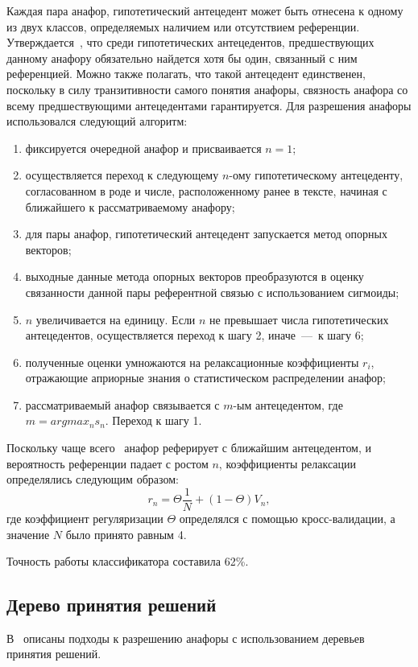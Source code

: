 Каждая пара анафор, гипотетический антецедент может быть отнесена к одному из двух классов, определяемых наличием или отсутствием референции. Утверждается~\cite{tolpegin2006algorithm}, что среди гипотетических антецедентов, предшествующих данному анафору обязательно найдется хотя бы один, связанный с ним референцией. Можно также полагать, что такой антецедент единственен, поскольку в силу транзитивности самого понятия анафоры, связность анафора со всему предшествующими антецедентами гарантируется. Для разрешения анафоры использовался следующий алгоритм:
\begin{enumerate}
	\item фиксируется очередной анафор и присваивается $n=1$;
	\item осуществляется переход к следующему $n$-ому гипотетическому антецеденту, согласованном в роде и числе, расположенному ранее в тексте, начиная с ближайшего к рассматриваемому анафору;
	\item для пары анафор, гипотетический антецедент запускается метод опорных векторов;
	\item выходные данные метода опорных векторов преобразуются в оценку связанности данной пары референтной связью с использованием сигмоиды;
	\item $n$ увеличивается на единицу. Если $n$ не превышает числа гипотетических антецедентов, осуществляется переход к шагу 2, иначе~---~к шагу 6;
	\item полученные оценки умножаются на релаксационные коэффициенты $r_i$, отражающие априорные знания о статистическом распределении анафор;
	\item рассматриваемый анафор связывается с $m$-ым антецедентом, где $m = argmax_n s_n$. Переход к шагу 1.  
\end{enumerate}

Поскольку чаще всего~\cite{tolpegin2006algorithm} анафор реферирует с ближайшим антецедентом, и вероятность референции падает с ростом $n$, коэффициенты релаксации определялись следующим образом:
\begin{equation}
	r_n = \Theta\frac{1}{N}+(1-\Theta)V_n,
\end{equation}
где коэффициент регуляризации $\Theta$ определялся с помощью кросс-валидации, а значение $N$ было принято равным 4.

Точность работы классификатора составила 62\%.

\subsection{Дерево принятия решений}
В~\cite{protopopova2014experience,gureenkova2017complex} описаны подходы к разрешению анафоры с использованием деревьев принятия решений. 

